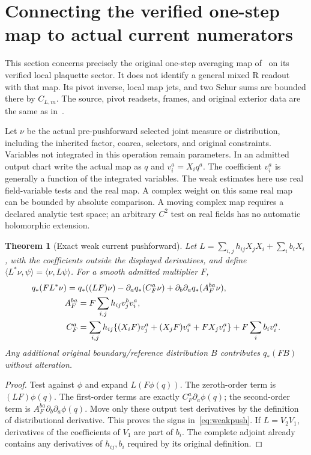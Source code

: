 \documentclass[11pt,letterpaper]{article}
\theoremstyle{plain}
\newtheorem{theorem}{Theorem}[section]
\theoremstyle{remark}\newtheorem{remark}[theorem]{Scope}
\begin{document}
\section{Connecting the verified one-step map to actual current numerators}
\label{sec:weakcurrent}

This section concerns precisely the original one-step averaging
map of~\cite[\S5]{PW} on its verified local plaquette sector. It does not identify a general
mixed R readout with that map. Its pivot inverse, local map jets, and two
Schur sums are bounded there by $C_{L,m}$. The source, pivot readsets,
frames, and original exterior data are the same as in~\cite[\S5]{PW}.

Let $\nu$ be the actual pre-pushforward selected joint measure or distribution,
including the inherited factor, coarea, selectors, and original constraints.
Variables not integrated in this operation remain parameters. In an admitted
output chart write the actual map as $q$ and $v_i^a=X_iq^a$.
The coefficient $v_i^a$ is generally a function of the integrated variables.
The weak estimates here use real field-variable tests and the real map. A
complex weight on this same real map can be bounded by absolute comparison.
A moving complex map requires a declared analytic test space; an arbitrary
$C^2$ test on real fields has no automatic holomorphic extension.


\begin{theorem}[Exact weak current pushforward]
Let
$L=\sum_{i,j}h_{ij}X_jX_i+\sum_i b_iX_i$, with the coefficients outside
the displayed derivatives, and define
$\langle L^*\nu,\psi\rangle=\langle\nu,L\psi\rangle$.
For a smooth admitted multiplier $F$,
\begin{align}
q_*(F L^*\nu)
={}&q_*((LF)\nu)-\partial_aq_*(C_F^a\nu)
+\partial_b\partial_aq_*(A_F^{ba}\nu),\label{eq:weakpush}\\
A_F^{ba}&=F\sum_{i,j}h_{ij}v_j^b v_i^a,\notag\\
C_F^a&=\sum_{i,j}h_{ij}\{(X_iF)v_j^a+(X_jF)v_i^a
+F X_jv_i^a\}+F\sum_i b_i v_i^a.
\label{eq:weakcoefficients}
\end{align}
Any additional original boundary/reference distribution $B$ contributes
$q_*(FB)$ without alteration.
\end{theorem}
\begin{proof}
Test against $\phi$ and expand $L(F\phi(q))$. The zeroth-order term is
$(LF)\phi(q)$. The first-order terms are exactly $C_F^a\partial_a\phi(q)$;
the second-order term is $A_F^{ba}\partial_b\partial_a\phi(q)$.
Move only these output test derivatives by the definition of distributional
derivative. This proves the signs in~\eqref{eq:weakpush}. If $L=V_2V_1$,
derivatives of the coefficients of $V_1$ are part of $b_i$. The complete
adjoint already contains any derivatives of $h_{ij},b_i$ required by its
original definition.
\end{proof}
\end{document}
